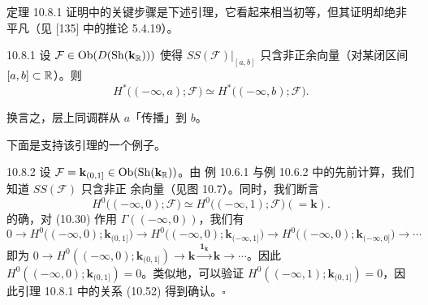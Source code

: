 定理 10.8.1 证明中的关键步骤是下述引理，它看起来相当初等，但其证明却绝非
平凡（见 [135] 中的推论 5.4.19）。

\begin{wlem}{10.8.1}
  设 $\mathcal F\in\operatorname{Ob}(D(\operatorname{Sh}(\mathbf{k}_{\mathbb{R}})))$ 使得
  $SS(\mathcal F)|_{[a,b]}$ 只含非正余向量（对某闭区间 $[a,b]\subset\mathbb{R}$）。则
  \begin{equation}\tag{10.52}
    H^*\bigl((-\infty,a);\mathcal F\bigr)
    \simeq H^*\bigl((-\infty,b);\mathcal F\bigr).
  \end{equation}
\end{wlem}

换言之，层上同调群从 $a$「传播」到 $b$。


下面是支持该引理的一个例子。

\begin{wexam}{10.8.2}
  设 $\mathcal F=\mathbf{k}_{(0,1]}\in\operatorname{Ob}(\operatorname{Sh}(\mathbf{k}_{\mathbb{R}}))$。由
  例 10.6.1 与例 10.6.2 中的先前计算，我们知道 $SS(\mathcal F)$ 只含非正
  余向量（见图 10.7）。同时，我们断言
  \[
    H^0\bigl((-\infty,0);\mathcal F\bigr)
    \simeq H^0\bigl((-\infty,1);\mathcal F\bigr)(=\mathbf{k}).
  \]
  的确，对 (10.30) 作用 $\Gamma((-\infty,0))$，我们有
  \[
    0\to H^0\bigl((-\infty,0);\mathbf{k}_{(0,1]}\bigr)
    \to H^0\bigl((-\infty,0);\mathbf{k}_{(-\infty,1]}\bigr)
    \to H^0\bigl((-\infty,0);\mathbf{k}_{(-\infty,0]}\bigr)\to\cdots
  \]
  即为
  $0\to H^0((-\infty,0);\mathbf{k}_{(0,1]})\to\mathbf{k}
  \xrightarrow{\ \mathbf{1}_{\mathbf{k}}\ }\mathbf{k}\to\cdots$。因此
  $H^0((-\infty,0);\mathbf{k}_{(0,1]})=0$。类似地，可以验证
  $H^0((-\infty,1);\mathbf{k}_{(0,1]})=0$，因此引理 10.8.1 中的关系 (10.52)
  得到确认。\hfill$\square$
\end{wexam}


